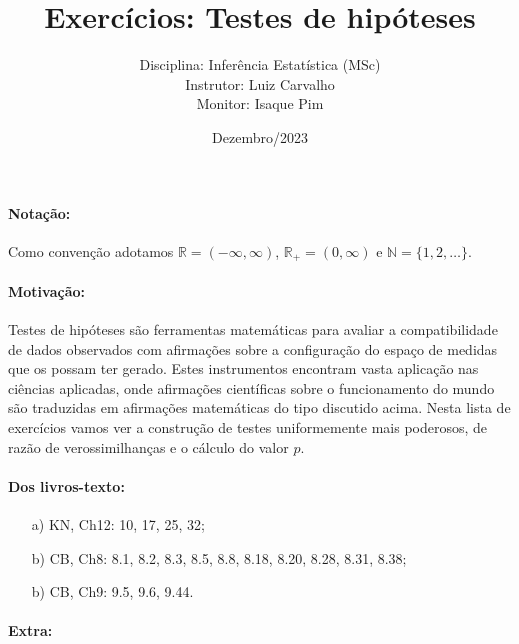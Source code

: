 \documentclass[a4paper,10pt, notitlepage]{report}
\title{Exercícios: Testes de hipóteses}
\author{Disciplina: Inferência Estatística (MSc) \\ Instrutor: Luiz Carvalho \\ Monitor: Isaque Pim}
\date{Dezembro/2023}
\newcommand{\rpl}{\mathbb{R}_+}
\begin{document}
\maketitle


\paragraph{Notação:} Como convenção adotamos $\mathbb{R} = (-\infty, \infty)$, $\rpl = (0, \infty)$ e $\mathbb{N} = \{1, 2, \ldots \}$.

\paragraph{Motivação:} Testes de hipóteses são ferramentas matemáticas para avaliar a compatibilidade de dados observados com afirmações sobre a configuração do espaço de medidas que os possam ter gerado. 
Estes instrumentos encontram vasta aplicação nas ciências aplicadas, onde afirmações científicas sobre o funcionamento do mundo são traduzidas em afirmações matemáticas do tipo discutido acima. 
Nesta lista de exercícios vamos ver a construção de testes uniformemente mais poderosos, de razão de verossimilhanças e o cálculo do valor $p$.

\paragraph{Dos livros-texto:}

\begin{itemize}
    \item[a)] KN, Ch12: 10, 17, 25, 32;  
    \item[b)] CB, Ch8: 8.1, 8.2, 8.3, 8.5, 8.8, 8.18, 8.20, 8.28, 8.31, 8.38;
    \item[b)] CB, Ch9: 9.5, 9.6, 9.44.
\end{itemize}

\paragraph{Extra:}
\end{document}
